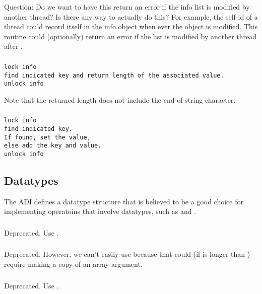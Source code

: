 \documentclass{article}
\begin{document}
Question:  Do we want to have this return an error if the info list is 
modified by another thread?  Is there any way to actually do this?  For
example, the self-id of a thread could record itself in the info object when
ever the object is modified.  This routine could (optionally) return an error
if the list is modified by another thread after .

\subsubsection{}
\begin{verbatim}
lock info
find indicated key and return length of the associated value.
unlock info
\end{verbatim}
Note that the returned length does not include the end-of-string character.

\subsubsection{}
\begin{verbatim}
lock info
find indicated key.  
If found, set the value,
else add the key and value.
unlock info

\end{verbatim}


\subsection{Datatypes}
The ADI defines a datatype structure that is believed to be a good
choice for implementing operatoins that involve datatypes, such as
 and .

\subsubsection{}
Deprecated.  Use .

\subsubsection{}
Deprecated.  However, we can't easily use 
because that could (if  is longer than ) require
making a copy of an array argument.

\subsubsection{}
Deprecated.  Use .
\end{document}

